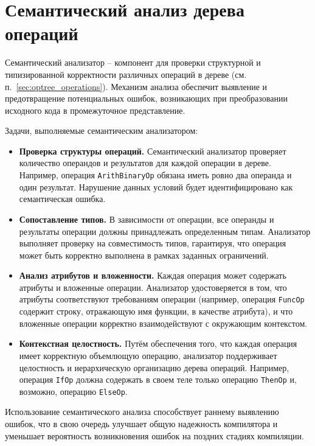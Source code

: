 \newpage
\section{Семантический анализ дерева операций}
\label{sec:semantizer}

Семантический анализатор -- компонент для проверки структурной и типизированной корректности различных операций в дереве (см. п.~\ref{sec:optree_operations}).
Механизм анализа обеспечит выявление и предотвращение потенциальных ошибок, возникающих при преобразовании исходного кода в промежуточное представление.

Задачи, выполняемые семантическим анализатором:

\begin{itemize}
  \item \textbf{Проверка структуры операций.}
        Семантический анализатор проверяет количество операндов и результатов для каждой операции в дереве.
        Например, операция \verb|ArithBinaryOp| обязана иметь ровно два операнда и один результат.
        Нарушение данных условий будет идентифицировано как семантическая ошибка.
  \item \textbf{Сопоставление типов.}
        В зависимости от операции, все операнды и результаты операции должны принадлежать определенным типам.
        Анализатор выполняет проверку на совместимость типов, гарантируя, что операция может быть корректно выполнена в рамках заданных ограничений.
  \item \textbf{Анализ атрибутов и вложенности.}
        Каждая операция может содержать атрибуты и вложенные операции.
        Анализатор удостоверяется в том, что атрибуты соответствуют требованиям операции (например, операция \verb|FuncOp| содержит строку, отражающую имя функции, в качестве атрибута), и что вложенные операции корректно взаимодействуют с окружающим контекстом.
  \item \textbf{Контекстная целостность.}
        Путём обеспечения того, что каждая операция имеет корректную объемлющую операцию, анализатор поддерживает целостность и иерархическую организацию дерева операций.
        Например, операция \verb|IfOp| должна содержать в своем теле только операцию \verb|ThenOp| и, возможно, операцию \verb|ElseOp|.
\end{itemize}

Использование семантического анализа способствует раннему выявлению ошибок, что в свою очередь улучшает общую надежность компилятора и уменьшает вероятность возникновения ошибок на поздних стадиях компиляции.


